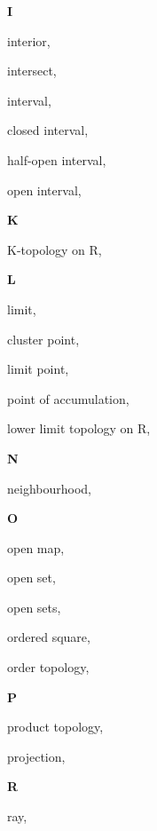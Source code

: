 \begin{multicols}{2}
\vspace{1em}\large{\textbf{I}}

interior, \pageref{def:Interior}

intersect, \pageref{def:Intersect}

interval, \pageref{def:Interval}

\hspace{2em}closed interval, \pageref{def:Interval}

\hspace{2em}half-open interval, \pageref{def:Interval}

\hspace{2em}open interval, \pageref{def:Interval}

\vspace{1em}\large{\textbf{K}}

K-topology on R, \pageref{def:KTopologyOnTheRealLine}

\vspace{1em}\large{\textbf{L}}

limit, \pageref{def:Limit}

cluster point, \pageref{def:LimitPoint}

limit point, \pageref{def:LimitPoint}

point of accumulation, \pageref{def:LimitPoint}

lower limit topology on R, \pageref{def:LowerLimitTopologyOnTheRealLine}

\vspace{1em}\large{\textbf{N}}

neighbourhood, \pageref{def:Neighbourhood}

\vspace{1em}\large{\textbf{O}}

open map, \pageref{def:OpenMap}

open set, \pageref{def:OpenSet}

open sets, \pageref{def:OpenSets}

ordered square, \pageref{def:OrderedSquare}

order topology, \pageref{def:OrderTopology}

\vspace{1em}\large{\textbf{P}}

product topology, \pageref{def:ProductTopology}

projection, \pageref{def:Projection}

\vspace{1em}\large{\textbf{R}}

ray, \pageref{def:Ray}


\end{multicols}
